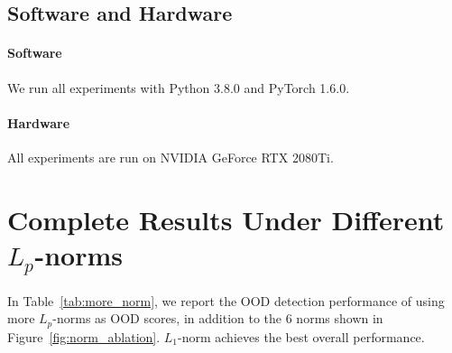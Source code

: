 \documentclass{article}
\begin{document}
\subsection{Software and Hardware}
\paragraph{Software} We run all experiments with Python 3.8.0 and PyTorch 1.6.0.
\paragraph{Hardware} All experiments are run on NVIDIA GeForce RTX 2080Ti.














\section{Complete Results Under Different $L_p$-norms}
\label{app:more_norm}
In Table~\ref{tab:more_norm}, we report the OOD detection performance of using more $L_p$-norms as OOD scores, in addition to the 6 norms shown in Figure~\ref{fig:norm_ablation}. $L_1$-norm achieves the best overall performance.
\end{document}
